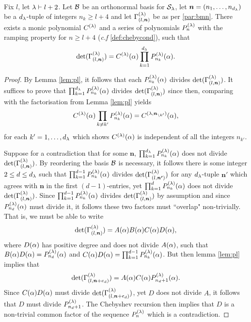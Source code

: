 \begin{proposition}\label{prop:main}
    Fix $l$, let $\lambda \vdash l+2$. Let $\mathcal{B}$ be an orthonormal basis for $\mathcal{S}_\lambda$, let $\bm{n}=(n_1,\dots, n_{d_\lambda})$ be a $d_\lambda$-tuple of integers $n_k\geq l+4$ and let $\Gamma_{(l,\bm{n})}^{(\lambda)}$ be as per \ref{par:bmn}. There exists a monic polynomial $C^{(\lambda)}$ and a series of polynomials $P^{(\lambda)}_{n}$ with the ramping property for $n\geq l+4$ (\textit{c.f} \ref{def:chebycond}), such that 
\[ \text{det}(\Gamma_{(l,\bm{n})}^{(\lambda)})=C^{(\lambda)}(\alpha) \prod_{k=1}^{d_{\lambda}} P^{(\lambda)}_{n_k}(\alpha).\]\end{proposition}
\begin{proof} By Lemma \ref{lem:pl}, it follows that each $P^{(\lambda)}_{n_k}(\alpha)$ divides $\text{det}(\Gamma_{(l,\bm{n})}^{(\lambda)})$. It suffices to prove that $\prod_{k=1}^{d_{\lambda}} P^{(\lambda)}_{n_k}(\alpha)$ divides $\text{det}(\Gamma_{(l,\bm{n})}^{(\lambda)})$ since then, comparing with the factorisation from Lemma \ref{lem:pl} yields
\[ C^{(\lambda)}(\alpha) \prod_{k\neq k' } P^{(\lambda)}_{n_k}(\alpha)= C^{(\lambda,\bm{n}_{\setminus k'})}(\alpha), \]
for each $k'=1,\dots, d_{\lambda}$ which shows $C^{(\lambda)}(\alpha)$ is independent of all the integers $n_{k'}$. 

Suppose for a contradiction that for some $\bm{n}$, $\prod_{k=1}^{d_{\lambda}} P^{(\lambda)}_{n_k}(\alpha)$ does not divide $\text{det}(\Gamma_{(l,\bm{n})}^{(\lambda)})$. By reordering the basis $\mathcal{B}$ is necessary, it follows there is some integer $2\leq d \leq d_{\lambda}$ such that $\prod_{k=1}^{d-1} P^{(\lambda)}_{n_k}(\alpha)$ divides $\text{det}(\Gamma_{(l,\bm{n'})}^{(\lambda)})$ for any $d_\lambda$-tuple $\bm{n'}$ which agrees with $\bm{n}$ in the first $(d-1)$-entries, yet $\prod_{k=1}^{d} P^{(\lambda)}_{n_k}(\alpha)$ does not divide $\text{det}(\Gamma_{(l,\bm{n})}^{(\lambda)})$. Since $\prod_{k=1}^{d-1} P^{(\lambda)}_{n_k}(\alpha)$ divides $\text{det}(\Gamma_{(l,\bm{n})}^{(\lambda)})$ by assumption and since $P^{(\lambda)}_{n_{d}}(\alpha)$ must divide it, it follows these two factors must ``overlap" non-trivially. That is, we must be able to write
\[ \text{det}(\Gamma_{(l,\bm{n})}^{(\lambda)})= A(\alpha) B(\alpha) C(\alpha) D(\alpha),\]
where $D(\alpha)$ has positive degree and does not divide $A(\alpha)$, such that $B(\alpha) D(\alpha)= P^{(\lambda)}_{n_{d}}(\alpha)$ and $C(\alpha) D(\alpha)= \prod_{k=1}^{d-1} P^{(\lambda)}_{n_k}(\alpha)$. But then lemma \ref{lem:pl} implies that   
\[\text{det}(\Gamma_{(l,\bm{n}+e_{d})}^{(\lambda)})= A(\alpha) C(\alpha)  P^{(\lambda)}_{n_{d}+1}(\alpha). \]
Since $C(\alpha)D(\alpha)$ must divide $\text{det}(\Gamma_{(l,\bm{n}+e_{d})}^{(\lambda)})$, yet $D$ does not divide $A$, it follows that $D$ must divide $P^{(\lambda)}_{n_{d}+1}$. The Chebyshev recursion then implies that $D$ is a non-trivial common factor of the sequence $P^{(\lambda)}_{n}$ which is a contradiction.\end{proof}

